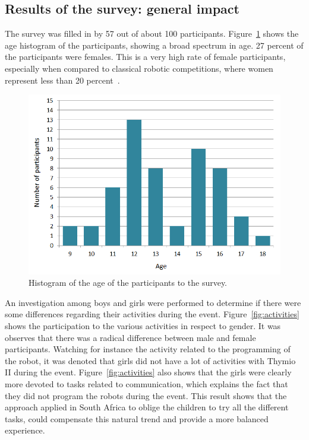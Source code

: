 \documentclass{intech-journal}
\begin{document}
\subsection{Results of the survey: general impact}

The survey was filled in by 57 out of about 100 participants. 
Figure~\ref{fig:age} shows the age histogram of the participants, showing a broad spectrum in age.
27 percent of the participants were females.
This is a very high rate of female participants, especially when compared to classical robotic competitions, where women represent less than 20 percent~\cite{riedo2013upgrade}.

\begin{figure}[ht]
 \centering
    \includegraphics[width=0.5\columnwidth]{figures/Age.png}
  \caption{Histogram of the age of the participants to the survey.}
  \label{fig:age} 
\end{figure}

An investigation among boys and girls were performed to determine if there were some differences regarding their activities during the event.
Figure~\ref{fig:activities} shows the participation to the various activities in respect to gender. 
It was observes that there was a radical difference between male and female participants. 
Watching for instance the activity related to the programming of the robot, it was denoted that girls did not have a lot of activities with Thymio II during the event. 
Figure~\ref{fig:activities} also shows that the girls were clearly more devoted to tasks related to communication, which explains the fact that they did not program the robots during the event. 
This result shows that the approach applied in South Africa to oblige the children to try all the different tasks, could compensate this natural trend and provide a more balanced experience.
\end{document}
